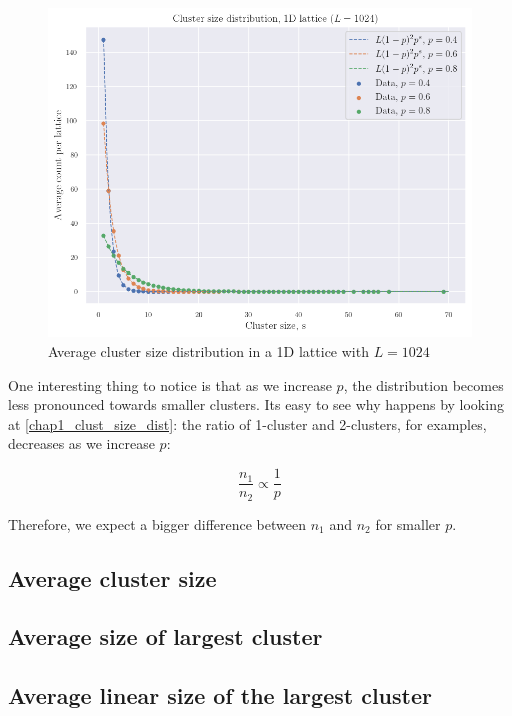 \begin{figure}[H]
  \includegraphics[width=\linewidth]{Images/chap1_clust_size_dist_1024.png}
  \caption{Average cluster size distribution in a 1D lattice with $L=1024$}
  \label{fig:chap1_clust_size_dist_1024}
\end{figure}


One interesting thing to notice is that as we increase $p$, the distribution becomes less pronounced towards smaller clusters. Its easy to see why happens by looking at \eqref{chap1_clust_size_dist}: the ratio of 1-cluster and 2-clusters, for examples, decreases as we increase $p$:

$$
\frac{n_1}{n_2} \propto \frac{1}{p}
$$

Therefore, we expect a bigger difference between $n_1$ and $n_2$ for smaller $p$.

\subsection{Average cluster size}

\subsection{Average size of largest cluster}

\subsection{Average linear size of the largest cluster}




